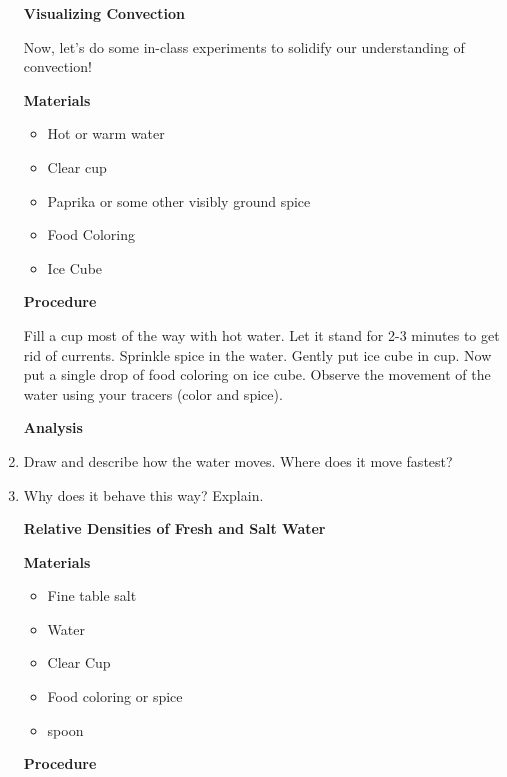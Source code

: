 \documentclass[letterpaper,11pt]{article}
\begin{document}
\begin{enumerate}
\textbf{\Large{Visualizing Convection}}
\vspace{.1in}

Now, let's do some in-class experiments to solidify our understanding of convection!
\vspace{.1in}

\textbf{Materials}
\begin{itemize}
\item Hot or warm water
\item Clear cup
\item Paprika or some other visibly ground spice
\item Food Coloring
\item Ice Cube
\end{itemize}

\vspace{.1in}
\textbf{Procedure}
\vspace{.1in}

Fill a cup most of the way with hot water.  Let it stand for 2-3 minutes to get
rid of currents.  Sprinkle spice in the water.  Gently put ice cube in cup.
Now put a single drop of food coloring on ice cube.  Observe the movement of 
the water using your tracers (color and spice).

\vspace{.1in}
\textbf{Analysis}
\vspace{.1in}

\item Draw and describe how the water moves.  Where does it move fastest?
\item Why does it behave this way?  Explain.
\vspace{.5in}

\textbf{\Large{Relative Densities of Fresh and Salt Water}}

\vspace{.1in}
\textbf{Materials}
\vspace{.1in}

\begin{itemize}
\item Fine table salt
\item Water
\item Clear Cup
\item Food coloring or spice
\item spoon
\end{itemize}

\vspace{.1in}
\textbf{Procedure}
\vspace{.1in}


\end{enumerate}
\end{document}
